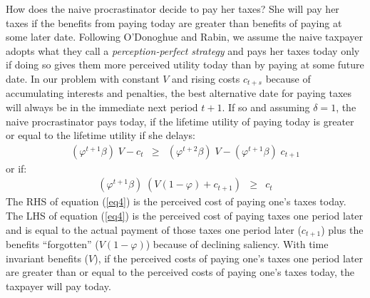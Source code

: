 How does the naive procrastinator decide to pay her taxes?  She will
pay her taxes if the benefits from paying today are greater than
benefits of paying at some later date.  Following O'Donoghue and
Rabin, we assume the naive taxpayer adopts what they call a
\textit{perception-perfect strategy} and pays her taxes today only if
doing so gives them more perceived utility today than by paying at
some future date.  In our problem with constant $V$ and rising costs
$c_{t+s}$ because of accumulating interests and penalties, the best
alternative date for paying taxes will always be in the immediate next
period $ t + 1$.  If so and assuming $\delta=1$, the naive
procrastinator pays today, if the lifetime utility of paying today is
greater or equal to the lifetime utility if she delays:
\begin{eqnarray}\label{eq3}
(\varphi^{t+1} \beta) \; V - c_ t &\ge& (\varphi^{t+2} \beta) \; V -
  (\varphi^{t+1} \beta) \; c_ {t+1}
\end{eqnarray}
or if: 
\begin{eqnarray}\label{eq4}
(\varphi^{t+1} \beta) \; (V (1-\varphi) + c_{t+1}) &\ge& c_ {t}
\end{eqnarray}
The RHS of equation (\ref{eq4}) is the perceived cost of paying one's
taxes today.  The LHS of equation (\ref{eq4}) is the perceived cost of
paying taxes one period later and is equal to the actual payment of
those taxes one period later ($c_{t+1}$) plus the benefits
``forgotten'' ($V(1 - \varphi)$) because of declining saliency. With time invariant benefits ($V$), if
the perceived costs of paying one's taxes one period later are greater
than or equal to the perceived costs of paying one's taxes today, the
taxpayer will pay today.

